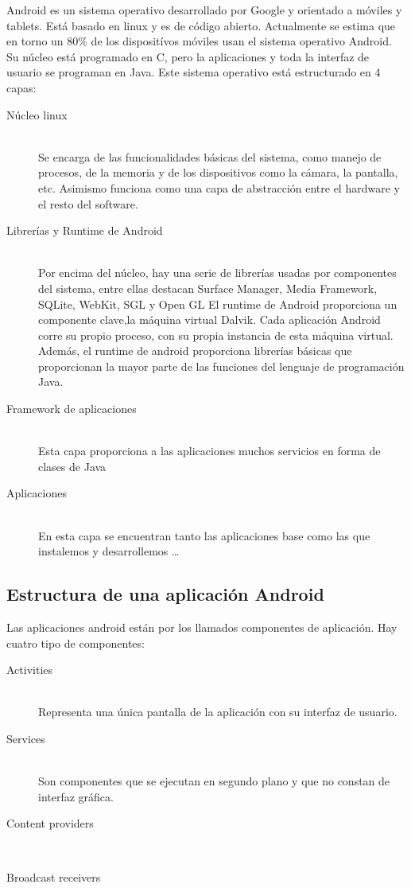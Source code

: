 \documentclass[a4paper,openright, 12pt]{book}
\begin{document}
Android es un sistema operativo desarrollado por Google y orientado a móviles y tablets. Está basado en linux y es de código abierto. Actualmente se estima que en torno un 80\% de los dispositívos móviles usan el sistema operativo Android.
Su núcleo está programado en C, pero la aplicaciones y toda la interfaz de usuario se programan en Java.
Este sistema operativo está estructurado en 4 capas:
\begin{description}
  \item[Núcleo linux] \hfill \\
  Se encarga de las funcionalidades básicas del sistema, como manejo de procesos, de la memoria y de los dispositivos como la cámara, la pantalla, etc.
   Asimismo funciona como una capa de abstracción entre el hardware y el resto del software.
   
  \item[Librerías y Runtime de Android] \hfill \\
  Por encima del núcleo, hay una serie de librerías usadas por componentes del sistema, entre ellas destacan Surface Manager, Media Framework, SQLite, WebKit, SGL y Open GL
  \newline
  El runtime de Android proporciona un componente clave,la máquina virtual Dalvik. Cada aplicación Android corre su propio proceso, con su propia instancia de esta máquina virtual.
  Además, el runtime de android proporciona librerías básicas que proporcionan la mayor parte de las funciones del lenguaje de programación Java.
  
  \item[Framework de aplicaciones] \hfill \\
  Esta capa proporciona a las aplicaciones muchos servicios en forma de clases de Java 
  
   \item[Aplicaciones] \hfill \\
  En esta capa se encuentran tanto las aplicaciones base como las que instalemos y desarrollemos   \ldots
\end{description}

\subsection*{Estructura de una aplicación Android}
Las aplicaciones android están por los llamados componentes de aplicación. Hay cuatro tipo de componentes:
\begin{description}
  \item[Activities] \hfill \\
  Representa una única pantalla de la aplicación con su interfaz de usuario.
  \item[Services] \hfill \\
  Son componentes que se ejecutan en segundo plano y que no constan de interfaz gráfica.
  \item[Content providers] \hfill \\
  \item[Broadcast receivers] \hfill \\
\end{description}
\end{document}
